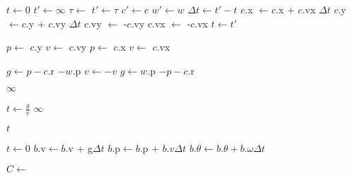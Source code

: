\documentclass{article}
\begin{document}
\begin{algorithmic}
        \State $t \gets 0$
            \State $t' \gets \infty$
                    \State $\tau \gets $ 
                        \State $t' \gets \tau$
                        \State $c' \gets c$
                        \State $w' \gets w$
                    \EndIf
                \EndFor
            \EndFor
            \State $\Delta t \gets t' - t$
                \State $c$.x $\gets c$.x + $c$.vx $\Delta t$
                \State $c$.y $\gets c$.y + $c$.vy $\Delta t$
            \EndFor
                \State $c$.vy $\gets$ -$c$.vy
            \Else
                \State $c$.vx $\gets$ -$c$.vx
            \EndIf
            \State $t \gets t'$
        \EndWhile
    \EndFunction
\end{algorithmic}

\newpage

\begin{algorithmic}
            \State $p \gets$ $c$.y
            \State $v \gets$ $c$.vy
        \Else
            \State $p \gets$ $c$.x
            \State $v \gets$ $c$.vx
        \EndIf

            \State $g \gets p - c$.r $- w$.p
            \State $v \gets -v$
        \Else
            \State $g \gets w$.p $- p - c$.r
        \EndIf

            \State \Return $\infty$
        \EndIf

        \State $t \gets \frac{g}{v}$
            \State \Return $\infty$
        \EndIf

        \State \Return $t$
    \EndFunction
\end{algorithmic}

\newpage

\begin{algorithmic}
        \State $t \gets 0$
                \State $b$.v$ \gets b$.v + g$ \Delta t$
                \State $b$.p$ \gets b$.p + $b$.$v \Delta t$
                \State $b$.$\theta \gets b$.$\theta + b.\omega \Delta t$
            \EndFor

            \State $C \gets$ 
            \State {}
        \EndWhile
    \EndFunction
\end{algorithmic}
\end{document}
